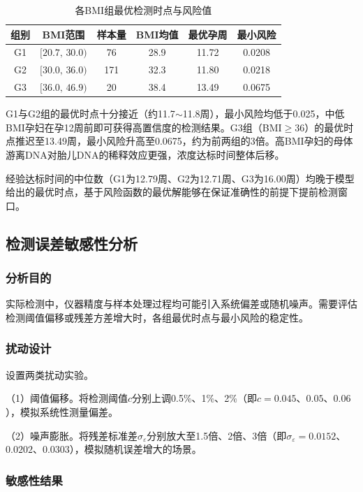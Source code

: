 \begin{table}[H]
  \centering
  \caption{各BMI组最优检测时点与风险值}\label{tab:opt_results}
  \begin{tabular}{cccccc}
    \toprule
    组别 & BMI范围 & 样本量 & BMI均值 & 最优孕周 & 最小风险 \\
    \midrule
    G1 & $[20.7,\,30.0)$ & 76  & 28.9 & 11.72 & 0.0208 \\
    G2 & $[30.0,\,36.0)$ & 171 & 32.3 & 11.80 & 0.0218 \\
    G3 & $[36.0,\,46.9)$ & 20  & 38.4 & 13.49 & 0.0675 \\
    \bottomrule
  \end{tabular}
\end{table}

G1与G2组的最优时点十分接近（约11.7$\sim$11.8周），最小风险均低于0.025，中低BMI孕妇在孕12周前即可获得高置信度的检测结果。G3组（BMI$\geq$36）的最优时点推迟至13.49周，最小风险升高至0.0675，约为前两组的3倍。高BMI孕妇的母体游离DNA对胎儿DNA的稀释效应更强，浓度达标时间整体后移。

经验达标时间的中位数（G1为12.79周、G2为12.71周、G3为16.00周）均晚于模型给出的最优时点，基于风险函数的最优解能够在保证准确性的前提下提前检测窗口。

\subsection{检测误差敏感性分析}

\subsubsection{分析目的}

实际检测中，仪器精度与样本处理过程均可能引入系统偏差或随机噪声。需要评估检测阈值偏移或残差方差增大时，各组最优时点与最小风险的稳定性。

\subsubsection{扰动设计}

设置两类扰动实验。

（1）阈值偏移。将检测阈值$c$分别上调0.5\%、1\%、2\%（即$c=0.045$、$0.05$、$0.06$），模拟系统性测量偏差。

（2）噪声膨胀。将残差标准差$\sigma_\varepsilon$分别放大至1.5倍、2倍、3倍（即$\sigma_\varepsilon=0.0152$、$0.0202$、$0.0303$），模拟随机误差增大的场景。

\subsubsection{敏感性结果}

